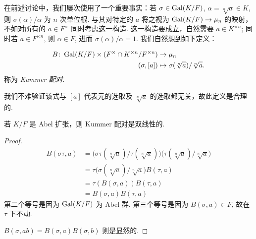 在前述讨论中，我们屡次使用了一个重要事实：若 $\sigma \in \operatorname{Gal}(K/F)$, $\alpha = \sqrt[n]{a} \in K$, 则 $\sigma(\alpha) / \alpha$ 为 $n$ 次单位根.  与其对特定的 $a$ 将之视为 $\operatorname{Gal}(K/F) \to \mu_n$ 的映射，不如对所有的 $a \in F^\times$ 同时考虑这一构造.  这一构造要成立，自然需要 $a \in K^{\times n}$; 同时若 $a \in F^{\times n}$, 则 $\alpha \in F$, 进而 $\sigma(\alpha)/\alpha = 1$.  我们自然想到如下定义：
\begin{defn}
  \begin{align*}
    B \colon \operatorname{Gal}(K/F) \times (F^\times \cap K^{\times n} / F^{\times n}) & \to \mu_n \\
    (\sigma, [a]) & \mapsto \sigma(\sqrt[n]{a})/\sqrt[n]{a}.
  \end{align*}
  称为 \emph{Kummer 配对}.
\end{defn}

我们不难验证该式与 $[a]$ 代表元的选取及 $\sqrt[n]{a}$ 的选取都无关，故此定义是合理的.
\begin{prop}
  若 $K/F$ 是 Abel 扩张，则 Kummer 配对是双线性的.
\end{prop}
\begin{proof}
  \begin{align*}
    B(\sigma\tau, a) &= \bigl(\sigma\tau(\sqrt[n]{a})/\tau(\sqrt[n]{a})\bigr)\bigl(\tau(\sqrt[n]{a})/\sqrt[n]{a}\bigr) \\
                     &= \tau\bigl(\sigma(\sqrt[n]{a})/\sqrt[n]{a}\bigr) B(\tau, a) \\
                     &= \tau(B(\sigma, a)) B(\tau, a) \\
                     &= B(\sigma, a)B(\tau, a)
  \end{align*}
  第二个等号是因为 $\operatorname{Gal}(K/F)$ 为 Abel 群.  第三个等号是因为 $B(\sigma, a) \in F$, 故在 $\tau$ 下不动.

  $B(\sigma, ab) = B(\sigma, a)B(\sigma, b)$ 则是显然的.
\end{proof}


